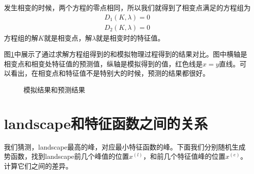 \documentclass[12pt,a4paper]{article}
\begin{document}
发生相变的时候，两个方程的零点相同，所以我们就得到了相变点满足的方程组为
\begin{align*}
D_1(K, \lambda) = 0 \\
D_2(K, \lambda) = 0
\end{align*}
方程组的解$K$就是相变点，解$\lambda$就是相变时的特征值。

图\ref{fD}中展示了通过求解方程组得到的和模拟物理过程得到的结果对比。图中横轴是相变点和相变处特征值的预测值，纵轴是模拟得到的值，红色线是$x=y$直线。可以看出，在相变点和特征值不是特别大的时候，预测的结果都很好。
\begin{figure}[h]
\centering
{}
\caption{模拟结果和预测结果}
\label{fD}
\end{figure}

\section*{landscape和特征函数之间的关系}

我们猜测，landscape最高的峰，对应最小特征函数的峰。下面我们分别随机生成势函数，找到landscape前几个峰值的位置$x^{(l)}$，和前几个特征值峰的位置$x^{(e)}$。计算它们之间的差异。
\end{document}
